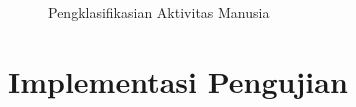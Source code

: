 \begin{figure}[h]
    \inputminted[firstline=34,firstnumber=34,lastline=56,gobble=4]{java}{../aktvtas/app/src/main/java/org/elins/aktvtas/human/HumanActivityClassifier.java}
    \caption{Pengklasifikasian Aktivitas Manusia}
    \label{listing:klasifikasi-aktivitas}
\end{figure}

\section{Implementasi Pengujian}
